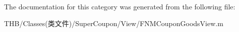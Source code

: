 The documentation for this category was generated from the following file\+:\begin{DoxyCompactItemize}
\item 
T\+H\+B/\+Classes(类文件)/\+Super\+Coupon/\+View/F\+N\+M\+Coupon\+Goods\+View.\+m\end{DoxyCompactItemize}
